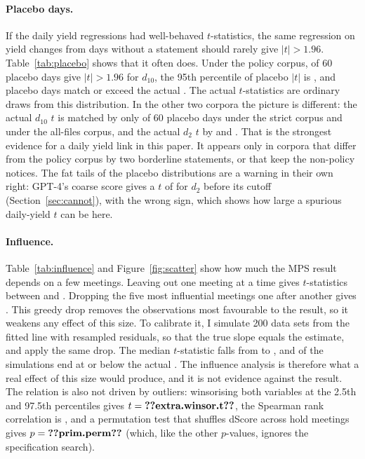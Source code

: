 \paragraph{Placebo days.} If the daily yield regressions had well-behaved $t$-statistics, the same
regression on yield changes from days without a statement should rarely give $|t|>1.96$. Table~\ref{tab:placebo}
shows that it often does. Under the policy corpus,  of 60 placebo days give
$|t|>1.96$ for $d_{10}$, the 95th percentile of placebo $|t|$ is , and
 placebo days match or exceed the actual . The actual
$t$-statistics are ordinary draws from this distribution. In the other two corpora the picture is
different: the actual $d_{10}$ $t$ is matched by only  of 60 placebo days
under the strict corpus and  under the all-files corpus, and the actual $d_2$
$t$ by  and . That is the strongest evidence for a
daily yield link in this paper. It appears only in corpora that differ from the policy corpus by two
borderline statements, or that keep the non-policy notices. The fat tails of the placebo distributions
are a warning in their own right: GPT-4's coarse score gives a $t$ of  for $d_2$
before its cutoff (Section~\ref{sec:cannot}), with the wrong sign, which shows how large a spurious
daily-yield $t$ can be here.

\paragraph{Influence.} Table~\ref{tab:influence} and Figure~\ref{fig:scatter} show how much the MPS result
depends on a few meetings. Leaving out one meeting at a time gives $t$-statistics between
 and . Dropping the five most influential meetings one after
another gives . This greedy drop removes the observations most favourable to the result,
so it weakens any effect of this size. To calibrate it, I simulate 200 data sets from the fitted line with
resampled residuals, so that the true slope equals the estimate, and apply the same drop. The median
$t$-statistic falls from  to , and  of the simulations end
at or below the actual . The influence analysis is therefore what a real effect of
this size would produce, and it is not evidence against the result. The relation is also not driven by
outliers: winsorising both variables at the 2.5th and 97.5th percentiles gives $t=\R{extra.winsor.t}$,
the Spearman rank correlation is , and a permutation test that shuffles dScore across
hold meetings gives $p=\R{prim.perm}$ (which, like the other $p$-values, ignores the specification
search).

